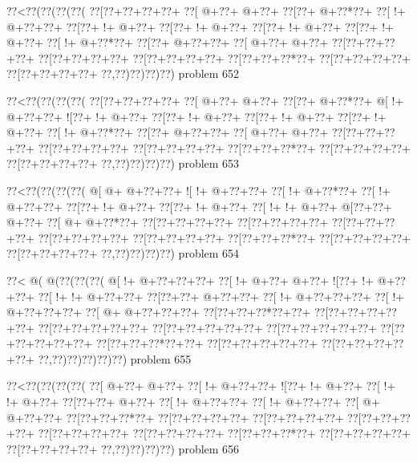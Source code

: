 \vbox{\vbox{\goo
\0??<\0??(\0??(\0??(\0??(
\0??[\0??+\0??+\0??+\0??+
\0??[\- @+\0??+\- @+\0??+
\0??[\0??+\- @+\0??*\0??+
\0??[\- !+\- @+\0??+\0??+
\0??[\0??+\- !+\- @+\0??+
\0??[\0??+\- !+\- @+\0??+
\0??[\0??+\- !+\- @+\0??+
\0??[\0??+\- !+\- @+\0??+
\0??[\- !+\- @+\0??*\0??+
\0??[\0??+\- @+\0??+\0??+
\0??[\- @+\0??+\- @+\0??+
\0??[\0??+\0??+\0??+\0??+
\0??[\0??+\0??+\0??+\0??+
\0??[\0??+\0??+\0??+\0??+
\0??[\0??+\0??+\0??*\0??+
\0??[\0??+\0??+\0??+\0??+
\0??[\0??+\0??+\0??+\0??+
\0??,\0??)\0??)\0??)\0??)
}
\hfil problem 652\hfil\break
}

\vbox{\vbox{\goo
\0??<\0??(\0??(\0??(\0??(
\0??[\0??+\0??+\0??+\0??+
\0??[\- @+\0??+\- @+\0??+
\0??[\0??+\- @+\0??*\0??+
\- @[\- !+\- @+\0??+\0??+
\- ![\0??+\- !+\- @+\0??+
\0??[\0??+\- !+\- @+\0??+
\0??[\0??+\- !+\- @+\0??+
\0??[\0??+\- !+\- @+\0??+
\0??[\- !+\- @+\0??*\0??+
\0??[\0??+\- @+\0??+\0??+
\0??[\- @+\0??+\- @+\0??+
\0??[\0??+\0??+\0??+\0??+
\0??[\0??+\0??+\0??+\0??+
\0??[\0??+\0??+\0??+\0??+
\0??[\0??+\0??+\0??*\0??+
\0??[\0??+\0??+\0??+\0??+
\0??[\0??+\0??+\0??+\0??+
\0??,\0??)\0??)\0??)\0??)
}
\hfil problem 653\hfil\break
}

\vbox{\vbox{\goo
\0??<\0??(\0??(\0??(\0??(
\- @[\- @+\- @+\0??+\0??+
\- ![\- !+\- @+\0??+\0??+
\0??[\- !+\- @+\0??*\0??+
\0??[\- !+\- @+\0??+\0??+
\0??[\0??+\- !+\- @+\0??+
\0??[\0??+\- !+\- @+\0??+
\0??[\- !+\- !+\- @+\0??+
\- @[\0??+\0??+\- @+\0??+
\0??[\- @+\- @+\0??*\0??+
\0??[\0??+\0??+\0??+\0??+
\0??[\0??+\0??+\0??+\0??+
\0??[\0??+\0??+\0??+\0??+
\0??[\0??+\0??+\0??+\0??+
\0??[\0??+\0??+\0??+\0??+
\0??[\0??+\0??+\0??*\0??+
\0??[\0??+\0??+\0??+\0??+
\0??[\0??+\0??+\0??+\0??+
\0??,\0??)\0??)\0??)\0??)
}
\hfil problem 654\hfil\break
}

\vbox{\vbox{\goo
\0??<\- @(\- @(\0??(\0??(\0??(
\- @[\- !+\- @+\0??+\0??+\0??+
\0??[\- !+\- @+\0??+\- @+\0??+
\- ![\0??+\- !+\- @+\0??+\0??+
\0??[\- !+\- !+\- @+\0??+\0??+
\0??[\0??+\0??+\- @+\0??+\0??+
\0??[\- !+\- @+\0??+\0??+\0??+
\0??[\- !+\- @+\0??+\0??+\0??+
\0??[\- @+\- @+\0??+\0??+\0??+
\0??[\0??+\0??+\0??*\0??+\0??+
\0??[\0??+\0??+\0??+\0??+\0??+
\0??[\0??+\0??+\0??+\0??+\0??+
\0??[\0??+\0??+\0??+\0??+\0??+
\0??[\0??+\0??+\0??+\0??+\0??+
\0??[\0??+\0??+\0??+\0??+\0??+
\0??[\0??+\0??+\0??*\0??+\0??+
\0??[\0??+\0??+\0??+\0??+\0??+
\0??[\0??+\0??+\0??+\0??+\0??+
\0??,\0??)\0??)\0??)\0??)\0??)
}
\hfil problem 655\hfil\break
}

\vbox{\vbox{\goo
\0??<\0??(\0??(\0??(\0??(
\0??[\- @+\0??+\- @+\0??+
\0??[\- !+\- @+\0??+\0??+
\- ![\0??+\- !+\- @+\0??+
\0??[\- !+\- !+\- @+\0??+
\0??[\0??+\0??+\- @+\0??+
\0??[\- !+\- @+\0??+\0??+
\0??[\- !+\- @+\0??+\0??+
\0??[\- @+\- @+\0??+\0??+
\0??[\0??+\0??+\0??*\0??+
\0??[\0??+\0??+\0??+\0??+
\0??[\0??+\0??+\0??+\0??+
\0??[\0??+\0??+\0??+\0??+
\0??[\0??+\0??+\0??+\0??+
\0??[\0??+\0??+\0??+\0??+
\0??[\0??+\0??+\0??*\0??+
\0??[\0??+\0??+\0??+\0??+
\0??[\0??+\0??+\0??+\0??+
\0??,\0??)\0??)\0??)\0??)
}
\hfil problem 656\hfil\break
}

